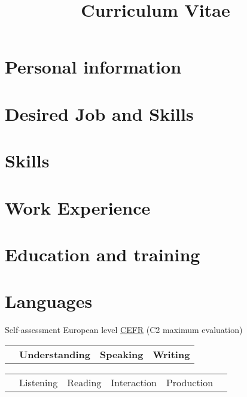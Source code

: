 \documentclass[11pt,a4paper,sans]{moderncv}
\title{Curriculum Vitae}               %
\begin{document}
\maketitle

\section{Personal information}
\myPersonalInformation{\myProfileId}

\section{Desired Job and Skills}
\cvline{}{\Large \myDesideredEmployment{\myProfileId}}
\cvline{}{\small \mySkillsForJobPosition{\myProfileId} 
}

\section{Skills} 
\mySkills{\myProfileId}
 
\section{Work Experience}
\myExperience{\myProfileId}

\section{Education and training}
\myEducation{\myProfileId}


\section{Languages}

\hspace{25mm}\small Self-assessment European level \href{http://europass.cedefop.europa.eu/en/resources/european-language-levels-cefr}{CEFR} (C2 maximum evaluation)\normalsize
\vspace{5mm}

\begin{tabular}{p{67mm} p{40mm} p{40mm} p{20mm}}
& \textbf{Understanding} & \textbf{Speaking} & \textbf{Writing} \\
\end{tabular}

\begin{tabular}{p{67mm} p{20mm} p{20mm} p{20mm} p{20mm} p{20mm}}
& Listening & Reading & Interaction & Production & \\
\end{tabular}
\end{document}
